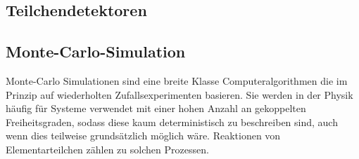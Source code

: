 %			
%			

\subsection{Teilchendetektoren}

\subsection{Monte-Carlo-Simulation}
\label{sec:montecarlo}

Monte-Carlo Simulationen sind eine breite Klasse Computeralgorithmen die im Prinzip auf wiederholten Zufallsexperimenten basieren. Sie werden in der Physik häufig für Systeme verwendet mit einer hohen Anzahl an gekoppelten Freiheitsgraden, sodass diese kaum deterministisch zu beschreiben sind, auch wenn dies teilweise grundsätzlich möglich wäre. Reaktionen von Elementarteilchen zählen zu solchen Prozessen.


